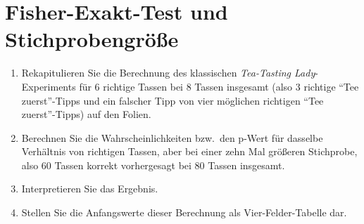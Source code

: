 \section{Fisher-Exakt-Test und Stichprobengröße}

\begin{enumerate}\Lf
  \item Rekapitulieren Sie die Berechnung des klassischen \textit{Tea-Tasting Lady}-Experiments für 6 richtige Tassen bei 8 Tassen insgesamt (also 3 richtige "`Tee zuerst"'-Tipps und ein falscher Tipp von vier möglichen richtigen "`Tee zuerst"'-Tipps) auf den Folien.
  \item Berechnen Sie die Wahrscheinlichkeiten bzw.\ den p-Wert für dasselbe Verhältnis von richtigen Tassen, aber bei einer zehn Mal größeren Stichprobe, also 60 Tassen korrekt vorhergesagt bei 80 Tassen insgesamt.\label{ex:1b}
  \item Interpretieren Sie das Ergebnis.\label{ex:1c}
  \item Stellen Sie die Anfangswerte dieser Berechnung als Vier-Felder-Tabelle dar.\label{ex:1d}
\end{enumerate}



